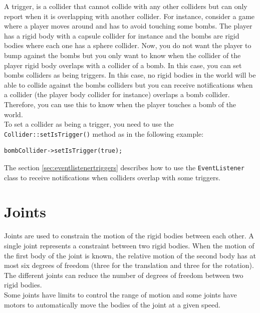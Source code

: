 \documentclass[a4paper,12pt]{article}
\begin{document}
    A trigger, is a collider that cannot collide with any other colliders but can only report when it is overlapping with another collider. For instance,
    consider a game where a player moves around and has to avoid touching some bombs. The player has a rigid body with a capsule collider for instance and
    the bombs are rigid bodies where each one has a sphere collider. Now, you do not want the player to bump against the bombs but you only want to know
    when the collider of the player rigid body overlaps with a collider of a bomb. In this case, you can set bombs colliders as being triggers. In this
    case, no rigid bodies in the world will be able to collide against the bombs colliders but you can receive notifications when a collider (the player
    body collider for instance) overlaps a bomb collider. Therefore, you can use this to know when the player touches a bomb of the world. \\
    
    To set a collider as being a trigger, you need to use the \texttt{Collider::setIsTrigger()} method as in the following example: \\

    \begin{lstlisting}
bombCollider->setIsTrigger(true);
   \end{lstlisting}

  
   \vspace{0.6cm}

   The section \ref{sec:eventlistenertriggers} describes how to use the \texttt{EventListener} class to receive notifications when colliders overlap
   with some triggers.
    
    \section{Joints}

    Joints are used to constrain the motion of the rigid bodies between each other. A single joint represents a constraint between two rigid bodies.
    When the motion of the first body of the joint is known, the relative motion of the second body has at most six degrees of freedom (three for the
    translation and three for the rotation). The different joints can reduce the number of degrees of freedom between two rigid bodies. \\

    Some joints have limits to control the range of motion and some joints have motors to automatically move the bodies of the joint at a given speed. \\
\end{document}

